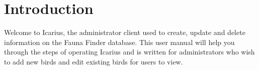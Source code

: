 \section{Introduction}
Welcome to Icarius, the administrator client used to create, update and delete information on the Fauna Finder database. This user manual will help you through the steps of operating Icarius and is written for administrators who wish to add new birds and edit existing birds for users to view.
